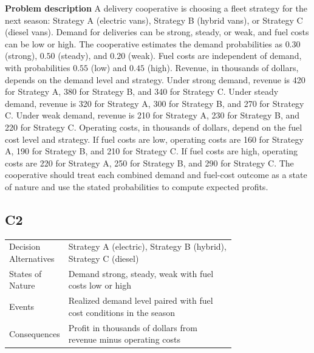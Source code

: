 \begin{ExamProblems}
		\item
		\textbf{Problem description}
		A delivery cooperative is choosing a fleet strategy for the next season: Strategy A (electric vans),
		Strategy B (hybrid vans), or Strategy C (diesel vans). Demand for deliveries can be strong, steady, or weak, and fuel costs can be low or high. The cooperative estimates the demand probabilities as $0.30$ (strong), $0.50$ (steady), and $0.20$ (weak). Fuel costs are independent of demand, with probabilities $0.55$ (low) and $0.45$ (high). Revenue, in thousands of dollars, depends on the demand level and strategy. Under strong demand, revenue is 420 for Strategy A, 380 for Strategy B, and 340 for Strategy C. Under steady demand, revenue is 320 for Strategy A, 300 for Strategy B, and 270 for Strategy C. Under weak demand, revenue is 210 for Strategy A, 230 for Strategy B, and 220 for Strategy C. Operating costs, in thousands of dollars, depend on the fuel cost level and strategy. If fuel costs are low, operating costs are 160 for Strategy A, 190 for Strategy B, and 210 for Strategy C. If fuel costs are high, operating costs are 220 for Strategy A, 250 for Strategy B, and 290 for Strategy C. The cooperative should treat each combined demand and fuel-cost outcome as a state of nature and use the stated probabilities to compute expected profits.

		\subsection*{C2}
		\begin{center}
			\begin{tabular}{l p{0.74\linewidth}}
				\toprule
				Decision Alternatives & Strategy A (electric), Strategy B (hybrid), Strategy C (diesel) \\
				States of Nature & Demand strong, steady, weak with fuel costs low or high \\
				Events & Realized demand level paired with fuel cost conditions in the season \\
				Consequences & Profit in thousands of dollars from revenue minus operating costs \\
				\bottomrule
			\end{tabular}
		\end{center}


\end{ExamProblems}
